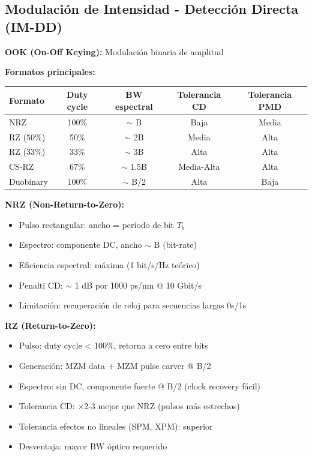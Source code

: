 \documentclass[11pt,a4paper]{article}
\begin{document}
\subsection{Modulación de Intensidad - Detección Directa (IM-DD)}

\textbf{OOK (On-Off Keying):} Modulación binaria de amplitud

\textbf{Formatos principales:}

\begin{table}[h]
\centering
\begin{tabular}{lcccc}
\hline
\textbf{Formato} & \textbf{Duty cycle} & \textbf{BW espectral} & \textbf{Tolerancia CD} & \textbf{Tolerancia PMD} \\
\hline
NRZ & 100\% & $\sim$ B & Baja & Media \\
RZ (50\%) & 50\% & $\sim$ 2B & Media & Alta \\
RZ (33\%) & 33\% & $\sim$ 3B & Alta & Alta \\
CS-RZ & 67\% & $\sim$ 1.5B & Media-Alta & Alta \\
Duobinary & 100\% & $\sim$ B/2 & Alta & Baja \\
\hline
\end{tabular}
\end{table}

\textbf{NRZ (Non-Return-to-Zero):}

\begin{itemize}
    \item Pulso rectangular: ancho = período de bit $T_b$
    \item Espectro: componente DC, ancho $\sim$ B (bit-rate)
    \item Eficiencia espectral: máxima (1 bit/s/Hz teórico)
    \item Penalti CD: $\sim$ 1 dB por 1000 ps/nm @ 10 Gbit/s
    \item Limitación: recuperación de reloj para secuencias largas 0s/1s
\end{itemize}

\textbf{RZ (Return-to-Zero):}

\begin{itemize}
    \item Pulso: duty cycle < 100\%, retorna a cero entre bits
    \item Generación: MZM data + MZM pulse carver @ B/2
    \item Espectro: sin DC, componente fuerte @ B/2 (clock recovery fácil)
    \item Tolerancia CD: $\times$2-3 mejor que NRZ (pulsos más estrechos)
    \item Tolerancia efectos no lineales (SPM, XPM): superior
    \item Desventaja: mayor BW óptico requerido
\end{itemize}
\end{document}
